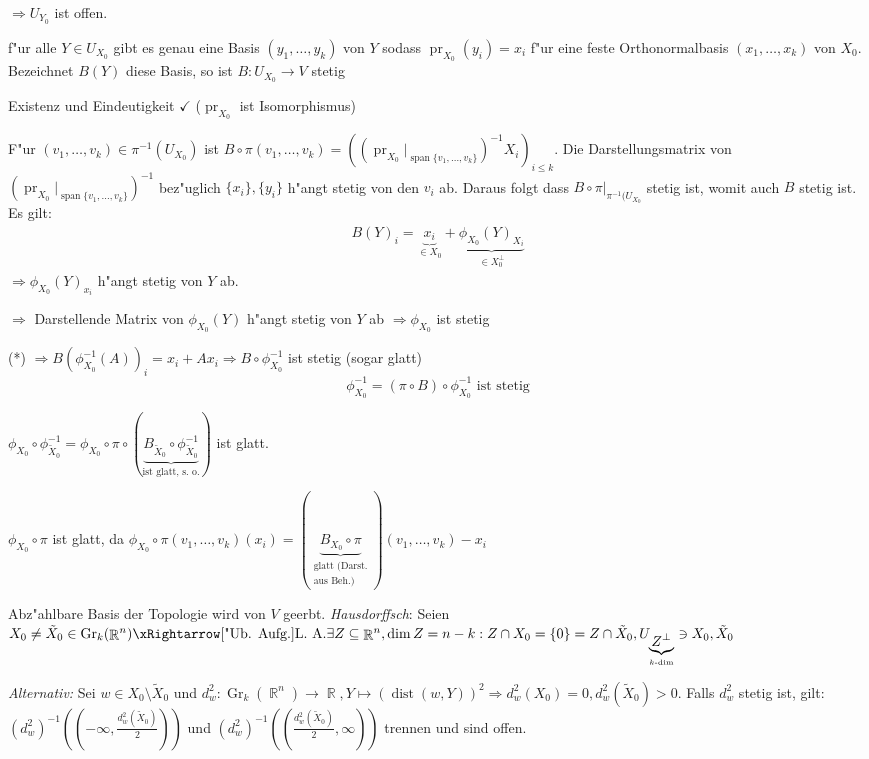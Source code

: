 \documentclass[paper=A4, twoside, chapterprefix=true, bibliography=totoc, headsepline]{scrbook}
\let\temp\phi
\let\phi\varphi
\let\varphi\temp
\let\temp\theta
\let\theta\vartheta
\let\vartheta\temp
\let\temp\epsilon
\let\epsilon\varepsilon
\let\varepsilon\temp
\let\temp\rho
\let\rho\varrho
\let\varrho\temp
\DeclareMathOperator{\R}{\mathbb{R}}
\DeclareMathOperator{\dist}{dist} %
\DeclareMathOperator{\mspan}{span} %
\DeclareMathOperator{\pr}{pr}
\DeclareMathOperator{\Gr}{Gr}
\theoremstyle{plain}
\theoremstyle{nonumberplain}
\theoremstyle{empty}
\theoremstyle{break}
\begin{document}
$\Rightarrow U_{Y_0}$ ist offen.
\begin{description}[font=\normalfont\bfseries]
\item[zu 2)]\begin{description}[font=\normalfont\itshape]
	\item[Behauptung:] f"ur alle $Y \in U_{X_0}$ gibt es genau eine Basis $(y_1,\ldots ,y_k)$ von $Y$ sodass $\pr_{X_0}(y_i) = x_i$ f"ur eine feste Orthonormalbasis $(x_1,\ldots ,x_k)$ von $X_0$. Bezeichnet $B(Y)$ diese Basis, so ist $B: U_{X_0} \to V$ stetig
	\item[Beweis:] Existenz und Eindeutigkeit $\checkmark$ ($\pr_{X_0}$ ist Isomorphismus)
		
		F"ur $(v_1,\ldots ,v_k) \in \pi^{-1}(U_{X_0})$ ist $B \circ \pi(v_1,\ldots ,v_k) = ((\pr_{X_0}|_{\mspan\{v_1,\ldots ,v_k\}})^{-1} X_i)_{i \le k}$. Die Darstellungsmatrix von $(\pr_{X_0}|_{\mspan\{v_1,\ldots ,v_k\}})^{-1}$ bez"uglich $\{x_i\}, \{y_i\}$ h"angt stetig von den $v_i$ ab. Daraus folgt dass $B \circ \pi|_{\pi^{-1}(U_{X_0}}$ stetig ist, womit auch $B$ stetig ist. Es gilt:
		\begin{align*}
			B(Y)_i = \underbrace{x_i}_{\in X_0} + \underbrace{\varphi_{X_0}(Y)_{X_i}}_{\in X_0^\perp} \tag{*}
		\end{align*}
		$\Rightarrow \varphi_{X_0}(Y)_{x_i}$ h"angt stetig von $Y$ ab.
		
		$\Rightarrow$ Darstellende Matrix von $\varphi_{X_0}(Y)$ h"angt stetig von $Y$ ab $\Rightarrow \varphi_{X_0}$ ist stetig
		
		(*) $\Rightarrow B(\varphi_{X_0}^{-1}(A))_i = x_i + Ax_i \Rightarrow B \circ \varphi_{X_0}^{-1}$ ist stetig (sogar glatt)
			\[ \varphi_{X_0}^{-1} = (\pi \circ B) \circ \varphi_{X_0}^{-1} \text{ ist stetig} \]
	\end{description}
\item[zu 3)]
	$\varphi_{X_0} \circ \varphi_{\tilde X_0}^{-1} = \varphi_{X_0} \circ \pi \circ (\underbrace{B_{\tilde X_0} \circ \varphi_{\tilde X_0}^{-1}}_{\text{ist glatt, s. o.}})$ ist glatt.
	
	$\varphi_{X_0} \circ \pi$ ist glatt, da $\varphi_{X_0} \circ \pi(v_1,\ldots ,v_k)(x_i) = (\underbrace{B_{X_0} \circ \pi}_{\substack{\text{glatt (Darst.}\\ \text{aus Beh.)}}})(v_1,\ldots ,v_k) - x_i$
\item[zu 4)]
	Abz"ahlbare Basis der Topologie wird von $V$ geerbt. \emph{Hausdorffsch}: Seien $X_0 \ne \tilde X_0 \in \Gr_k(\R^n) \xRightarrow[\text{"Ub. Aufg.}]{\text{L. A.}} \exists Z \subseteq \R^n, \dim Z = n-k: Z \cap X_0 = \{0\} = Z \cap \tilde X_0, U_{\underbrace{Z^\perp}_{k\text{-dim}}} \ni X_0, \tilde X_0$
	
	\emph{Alternativ:} Sei $w \in X_0 \setminus \tilde X_0$ und $d_w^2: \Gr_k(\R^n) \to \R, Y \mapsto (\dist(w, Y))^2 \Rightarrow d_w^2(X_0) = 0, d_w^2(\tilde X_0) > 0$. Falls $d_w^2$ stetig ist, gilt: $(d_w^2)^{-1}((-\infty, \frac{d_w^2(\tilde X_0)}{2}))$ und $(d_w^2)^{-1}((\frac{d_w^2(\tilde X_0)}{2}, \infty))$ trennen und sind offen.
\end{description}
\end{document}
